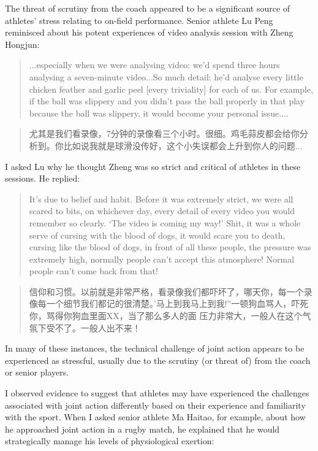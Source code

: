 \begin{CJK}{UTF8}{gbsn}
The threat of scrutiny from the coach appeared to be a significant source of athletes' stress relating to on-field performance.  Senior athlete Lu Peng reminisced about his potent experiences of video analysis session with Zheng Hongjun:

\begin{quote}
  ...especially when we were analysing video: we'd spend three hours analysing a seven-minute video...So much detail: he'd analyse every little chicken feather and garlic peel [every triviality] for each of us. For example, if the ball was slippery and you didn't pass the ball properly in that play because the ball was slippery, it would become your personal issue....
\end{quote}

\begin{quote}
    尤其是我们看录像，7分钟的录像看三个小时。很细。鸡毛蒜皮都会给你分析到。你比如说我就是球滑没传好，这个小失误都会上升到你人的问题...
\end{quote}

I asked Lu why he thought Zheng was so strict and critical of athletes in these sessions.  He replied:

\begin{quote}
    It's due to belief and habit. Before it was extremely strict, we were all scared to bits, on whichever day, every detail of every video you would remember so clearly. `The video is coming my way!'  Shit, it was a whole serve of cursing with the blood of dogs, it would scare you to death, cursing like the blood of dogs, in front of all these people, the pressure was extremely high, normally people can't accept this atmosphere! Normal people can't come back from that!
\end{quote}

  \begin{quote}
      信仰和习惯。以前就是非常严格，看录像我们都吓坏了，哪天你，每一个录像每一个细节我们都记的很清楚。'马上到我马上到我!''一顿狗血骂人，吓死你，骂得你狗血里面XX，当了那么多人的面 压力非常大，一般人在这个气氛下受不了。一般人出不来！
  \end{quote}


In many of these instances, the technical challenge of joint action appears to be experienced as stressful, usually due to the scrutiny (or threat of) from the coach or senior players.


I observed evidence to suggest that athletes may have experienced the challenges associated with joint action differently based on their experience and familiarity with the sport.  When I asked senior athlete Ma Haitao, for example, about how he approached joint action in a rugby match, he explained that he would strategically manage his levels of physiological exertion:


\end{CJK}
